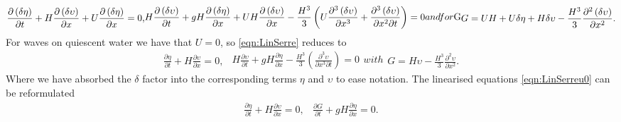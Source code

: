 \begin{subequations}
	\begin{gather}
		\label{eqn:LinCont}
		\frac{\partial  \left(\delta\eta \right)}{\partial  t} + H\frac{\partial  \left(\delta\upsilon \right)}{\partial  x} + U\frac{\partial  \left(\delta\eta \right)}{\partial  x}  = 0,
	\end{gather}
	\begin{gather}
	\label{eqn:LineMome}
	H\frac{\partial  \left(\delta\upsilon \right)}{\partial  t} + gH\frac{\partial  \left(\delta\eta \right)}{\partial  x} + UH\frac{\partial  \left(\delta\upsilon \right)}{\partial  x} - \frac{H^3}{3}\left(U\frac{\partial^3  \left(\delta\upsilon \right)}{\partial  x^3} + \frac{\partial^3  \left(\delta\upsilon \right)}{\partial  x^2 \partial  t}  \right)  = 0
	\end{gather}
\label{eqn:LinSerre}	
and for $G$
\begin{gather}
	G = UH + U \delta \eta + H \delta \upsilon -\frac{H^3}{3} \frac{\partial^2 \left(\delta\upsilon \right)}{\partial x^2}.
	\label{eqn:LinConSerreG}
\end{gather}	
\end{subequations}
For waves on quiescent water we have that $U =0$, so \eqref{eqn:LinSerre}  reduces to
\begin{subequations}
	\label{eqn:LinSerreu0}
	\begin{gather}
	\label{eqn:LinContu0}
	\frac{\partial  \eta}{\partial  t} + H\frac{\partial  \upsilon}{\partial  x} = 0,
	\end{gather}
	\begin{gather}
	\label{eqn:LineMomeu0}
	H\frac{\partial  \upsilon}{\partial  t} + g H \frac{\partial  \eta}{\partial  x} - \frac{H^3}{3}\left(\frac{\partial^3  \upsilon}{\partial  x^3 \partial  t}  \right)  = 0
	\end{gather}	
	with
	\begin{gather}
	G = H\upsilon -\frac{H^3}{3} \frac{\partial^2 \upsilon}{\partial x^2}.
	\label{eqn:LinConSerreGu0}
	\end{gather}	
\end{subequations}
Where we have absorbed the $\delta$ factor into the corresponding terms $\eta$ and $\upsilon$ to ease notation. The linearised equations \eqref{eqn:LinSerreu0} can be reformulated 
\begin{subequations}
	\begin{gather}
	\label{eqn:LinContG}
	\frac{\partial  \eta}{\partial  t} + H\frac{\partial  \upsilon}{\partial  x} = 0,
	\end{gather}
	\begin{gather}
	\label{eqn:LineMomeG}
	\frac{\partial  G}{\partial  t} + g H \frac{\partial  \eta}{\partial  x}  = 0.
	\end{gather}
	\label{eqn:LinSerreG}	
\end{subequations}

